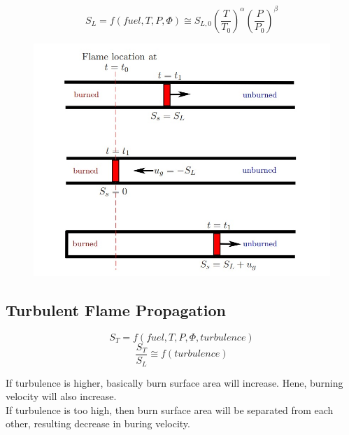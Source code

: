 \documentclass{article}
\begin{document}
$$S_L= f(fuel, T, P, \Phi) \cong S_{L,0} \left(\frac{T}{T_0}\right)^\alpha \left(\frac{P}{P_0}\right)^\beta$$

\begin{figure}[h]
  \begin{center}
    \includegraphics[width=0.9\linewidth]{img/laminar_flame.jpeg}
  \end{center}
\end{figure}

\subsection*{Turbulent Flame Propagation}
$$S_T = f\left(fuel, T, P, \Phi, turbulence\right)$$
$$\frac{S_T}{S_L} \cong f(turbulence) $$

If turbulence is higher, basically burn surface area will increase. Hene, burning velocity will also increase. \\
If turbulence is too high, then burn surface area will be separated from each other, resulting decrease in buring velocity. 
\end{document}

